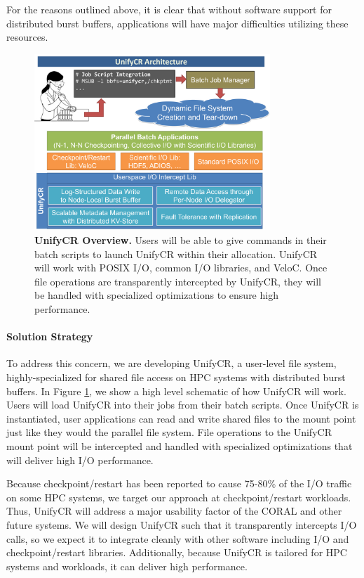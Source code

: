 For the reasons outlined above, it is clear that without software support 
for distributed burst buffers, applications
will have major difficulties utilizing these resources. 

\begin{figure}[htb]
        \centering
        \includegraphics[width=3.5in]{projects/2.3.4-DataViz/2.3.4.15-HDF5-UnifyCR/UnifyCR-overview}
        \caption{\label{fig:unifycr-overview} \textbf{UnifyCR Overview.} Users will be able to give commands in their batch scripts to launch UnifyCR within
their allocation. UnifyCR will work with POSIX I/O, common I/O libraries, and
VeloC. Once file operations are transparently intercepted by UnifyCR, they
will be handled with specialized optimizations to ensure high performance.}
\end{figure}

\paragraph{Solution Strategy}

To address this concern, we are developing UnifyCR, a user-level file system,
highly-specialized for shared file access on HPC systems with distributed
burst buffers. In Figure \ref{fig:unifycr-overview}, we show a high
level schematic of how UnifyCR will work. Users will load UnifyCR into
their jobs from their batch scripts. Once UnifyCR is instantiated, user
applications can read and write shared files to the mount point just like
they would the parallel file system. File operations to the UnifyCR
mount point will be intercepted and handled with specialized optimizations
that will deliver high I/O performance. 

Because checkpoint/restart has been reported to cause 75-80\%
of the I/O traffic on some HPC systems, we target our approach at
checkpoint/restart workloads. Thus, UnifyCR will address a major usability
factor of the CORAL and other future systems. We will design UnifyCR such
that it transparently intercepts I/O calls, so we expect it to integrate
cleanly with other software including I/O and checkpoint/restart libraries.
Additionally, because UnifyCR is tailored for HPC systems and workloads,
it can deliver high performance.



